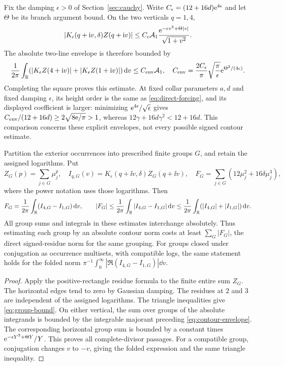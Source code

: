 Fix the damping $\epsilon>0$ of Section~\ref{sec:cauchy}. Write
$C_\epsilon=(12+16d)\mathrm e^{4\epsilon}$ and let $\Theta$ be its branch
argument bound. On the two verticals $q=1,4$,
\[
 |K_\epsilon(q+\mathrm i v,\delta)Z(q+\mathrm i v)|
 \le C_\epsilon\mathcal A_1
        \frac{\mathrm e^{-\epsilon v^2+\Theta|v|}}{\sqrt{1+v^2}}.
\]
The absolute two-line envelope is therefore bounded by
\begin{equation}
 \frac1{2\pi}\int_\mathbb R
       (|K_\epsilon Z(4+\mathrm i v)|+|K_\epsilon Z(1+\mathrm i v)|)\,\mathrm d v
 \le C_{\rm env}\mathcal A_1,
 \quad C_{\rm env}=\frac{2C_\epsilon}{\pi}
       \sqrt{\frac\pi\epsilon}\mathrm e^{\Theta^2/(4\epsilon)}.
 \label{eq:contour-envelope}
\end{equation}
Completing the square proves this estimate. At fixed collar parameters
$a,d$ and fixed damping $\epsilon$, its height order is the same as
\eqref{eq:direct-forcing}, and its displayed coefficient is
larger: minimizing $\mathrm e^{4\epsilon}/\sqrt\epsilon$ gives
$C_{\rm env}/(12+16d)\ge2\sqrt{8\mathrm e/\pi}>1$, whereas
$12\gamma+16d\gamma^2<12+16d$.
This comparison concerns these explicit envelopes, not every possible
signed contour estimate.

\begin{proposition}\label{prop:group-bound}
Partition the exterior occurrences into prescribed finite groups $G$,
and retain the assigned logarithms. Put
\[
 Z_G(p)=\sum_{j\in G}\mu_j^p,\quad
 I_{q,G}(v)=K_\epsilon(q+\ii v,\delta)Z_G(q+\ii v),\quad
 F_G=\sum_{j\in G}(12\mu_j^2+16\delta\mu_j^3),
\]
where the power notation uses those logarithms. Then
\begin{equation}
 F_G=\frac1{2\pi}\int_\mathbb R(I_{4,G}-I_{1,G})\,\mathrm d v,
 \qquad
 |F_G|\le\frac1{2\pi}\int_\mathbb R|I_{4,G}-I_{1,G}|\,\mathrm d v
 \le\frac1{2\pi}\int_\mathbb R(|I_{4,G}|+|I_{1,G}|)\,\mathrm d v.
 \label{eq:group-bound}
\end{equation}
All group sums and integrals in these estimates interchange absolutely.
Thus estimating each group by an absolute contour norm costs at least
$\sum_G|F_G|$, the direct signed-residue norm for the same grouping.
For groups closed under conjugation as occurrence multisets, with compatible
logs, the same statement holds for the folded
norm $\pi^{-1}\int_0^\infty|\Re(I_{4,G}-I_{1,G})|\dd v$.
\end{proposition}

\begin{proof}
Apply the positive-rectangle residue formula to the finite entire
sum $Z_G$. The horizontal edges tend to zero by Gaussian damping.
The residues at $2$ and $3$ are independent of the assigned logarithms.
The triangle inequalities give \eqref{eq:group-bound}. On either
vertical, the sum over groups of the absolute integrands is bounded
by the integrable majorant preceding \eqref{eq:contour-envelope}.
The corresponding horizontal group sum is bounded by a constant times
$\mathrm e^{-\epsilon Y^2+\Theta Y}/Y$. This proves all complete-divisor
passages. For a compatible group, conjugation changes $v$ to $-v$,
giving the folded expression and the same triangle inequality.
\end{proof}

